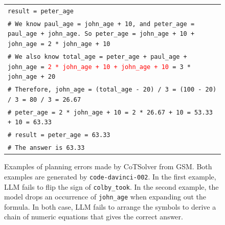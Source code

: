 \documentclass{article}
\theoremstyle{definition}
\newcommand\ttsmall[1]{\texttt{\small #1}}
\newcommand{\gsm}{\textsc{GSM}}
\begin{document}
\begin{figure}[h]
\begin{tabularx}{\linewidth}{X}
  \tt  result = peter\_age \\
  \tt  \# We know paul\_age = john\_age + 10, and peter\_age = paul\_age + john\_age. So peter\_age = john\_age + 10 + john\_age = 2 * john\_age + 10 \\
   \tt \# We also know total\_age = peter\_age + paul\_age + john\_age = \textcolor{red}{2 * john\_age + 10 + john\_age + 10} = 3 * john\_age + 20 \\
  \tt  \# Therefore, john\_age = (total\_age - 20) / 3 = (100 - 20) / 3 = 80 / 3 = 26.67 \\
  \tt  \# peter\_age = 2 * john\_age + 10 = 2 * 26.67 + 10 = 53.33 + 10 = 63.33 \\
   \tt \# result = peter\_age = 63.33 \\
   \tt \# The answer is 63.33 \\
\bottomrule
    \end{tabularx}
    \caption{Examples of planning errors made by {\sc CoTSolver} from \gsm{}. Both examples are generated by \ttsmall{code-davinci-002}. In the first example, LLM fails to flip the sign of \texttt{colby\_took}. In the second example, the model drops an occurrence of \texttt{john\_age} when expanding out the formula. In both case, LLM fails to arrange the symbols to derive a chain of numeric equations that gives the correct answer. }
    \label{fig:gsm_cotsolver_err_plan}
\end{figure}
\end{document}
